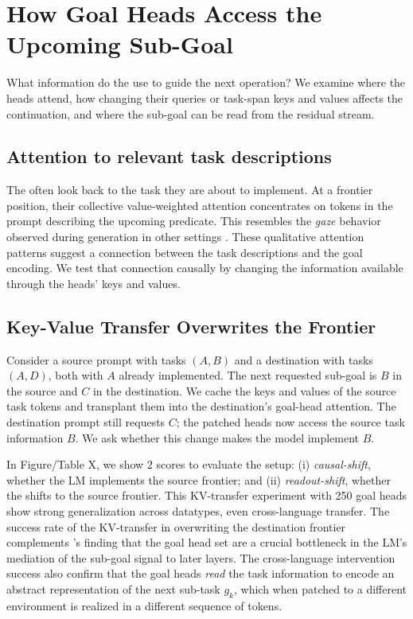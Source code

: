 \section{How Goal Heads Access the Upcoming Sub-Goal}
\label{sec:mechanism}
\label{sec:steer}
What information do the \goalheads use to guide the next operation? We examine where the heads attend, how changing their queries or task-span keys and values affects the continuation, and where the sub-goal can be read from the residual stream.

\subsection{Attention to relevant task descriptions}
\label{sec:mechanism:gaze}
The \goalheads often look back to the task they are about to implement. At a frontier position, their collective value-weighted attention concentrates on tokens in the prompt describing the upcoming predicate. This resembles the \emph{gaze} behavior observed during generation in other settings \citep{gandikota2026gaze}. These qualitative attention patterns suggest a connection between the task descriptions and the goal encoding. We test that connection causally by changing the information available through the heads' keys and values.

\subsection{Key-Value Transfer Overwrites the Frontier}
\label{sec:steer:transplant}
\label{sec:steer:crosslang}
\label{sec:steer:kv-transfer}
Consider a source prompt with tasks $(A,B)$ and a destination with tasks $(A,D)$, both with $A$ already implemented. The next requested sub-goal is $B$ in the source and $C$ in the destination. We cache the keys and values of the source task tokens and transplant them into the destination's goal-head attention. The destination prompt still requests $C$; the patched heads now access the source task information $B$. We ask whether this change makes the model implement $B$. 

In {\color{red} Figure/Table X}, we show 2 scores to evaluate the setup: (i) \emph{causal-shift}, whether the LM implements the source frontier; and (ii) \emph{readout-shift}, whether the \goalscope shifts to the source frontier. This KV-transfer experiment with 250 goal heads show strong generalization across datatypes, even cross-language transfer. The success rate of the KV-transfer in overwriting the destination frontier complements 's finding that the goal head set are a crucial bottleneck in the LM's mediation of the sub-goal signal to later layers. The cross-language intervention success also confirm that the goal heads \emph{read} the task information to encode an abstract representation of the next sub-task $g_k$, which when patched to a different environment is realized in a different sequence of tokens. 

